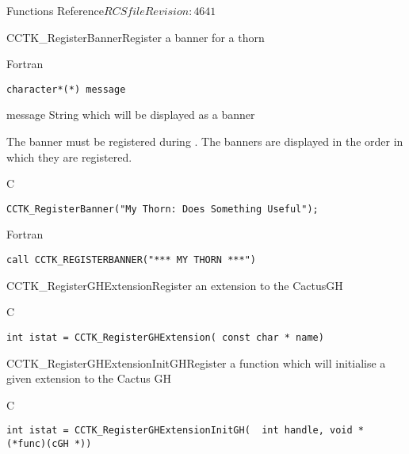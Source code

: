 \begin{cactuspart}{ Functions Reference}{$RCSfile$}{$Revision: 4641 $}
\begin{FunctionDescription}{CCTK\_RegisterBanner}{Register a banner for a thorn}
\begin{SynopsisSection}
\begin{Synopsis}{Fortran}
\begin{verbatim}
character*(*) message\end{verbatim}
\end{Synopsis}
\end{SynopsisSection}
\begin{ParameterSection}
\begin{Parameter}{message}
String which will be displayed as a banner
\end{Parameter}
\end{ParameterSection}
\begin{Discussion}
The banner must be registered during . The banners are
displayed in the order in which they are registered.
\end{Discussion}
\begin{ExampleSection}
\begin{Example}{C}
\begin{verbatim}
CCTK_RegisterBanner("My Thorn: Does Something Useful");
\end{verbatim}
\end{Example}
\begin{Example}{Fortran}
\begin{verbatim}
call CCTK_REGISTERBANNER("*** MY THORN ***")
\end{verbatim}
\end{Example}
\end{ExampleSection}
\end{FunctionDescription}

\begin{FunctionDescription}{CCTK\_RegisterGHExtension}{Register an extension to the CactusGH}
\label{CCTK-RegisterGHExtension}
\begin{SynopsisSection}
\begin{Synopsis}{C}
\begin{verbatim}int istat = CCTK_RegisterGHExtension( const char * name)\end{verbatim}
\end{Synopsis}
\end{SynopsisSection}
\end{FunctionDescription}

\begin{FunctionDescription}{CCTK\_RegisterGHExtensionInitGH}{Register a function which will initialise a given extension to the Cactus GH}
\label{CCTK-RegisterGHExtensionInitGH}
\begin{SynopsisSection}
\begin{Synopsis}{C}
\begin{verbatim}int istat = CCTK_RegisterGHExtensionInitGH(  int handle, void * (*func)(cGH *))\end{verbatim}
\end{Synopsis}
\end{SynopsisSection}
\end{FunctionDescription}


\end{cactuspart}
